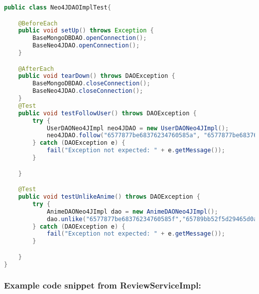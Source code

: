 \begin{mdframed}[style=customstyle]
\begin{lstlisting}[language=java]
public class Neo4JDAOImplTest{

    @BeforeEach
    public void setUp() throws Exception {
        BaseMongoDBDAO.openConnection();
        BaseNeo4JDAO.openConnection();
    }

    @AfterEach
    public void tearDown() throws DAOException {
        BaseMongoDBDAO.closeConnection();
        BaseNeo4JDAO.closeConnection();
    }
    @Test
    public void testFollowUser() throws DAOException {
        try {
            UserDAONeo4JImpl neo4JDAO = new UserDAONeo4JImpl();
            neo4JDAO.follow("6577877be68376234760585a", "6577877be683762347605859");
        } catch (DAOException e) {
            fail("Exception not expected: " + e.getMessage());
        }

    }

    @Test
    public void testUnlikeAnime() throws DAOException {
        try {
            AnimeDAONeo4JImpl dao = new AnimeDAONeo4JImpl();
            dao.unlike("6577877be68376234760585f","65789bb52f5d29465d0abd09");
        } catch (DAOException e) {
            fail("Exception not expected: " + e.getMessage());
        }

    }
}\end{lstlisting}
\end{mdframed}


\subsubsection*{Example code snippet from ReviewServiceImpl:}

